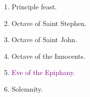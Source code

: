 		\begin{enumerate}
			\item {} Principle feast.
			\item Octave of Saint Stephen. 
			\item Octave of Saint John. 
			\item Octave of the Innocents. 
			\item \textcolor{purple}{Eve of the Epiphany.} 
			\item {} Solemnity.
		\end{enumerate}